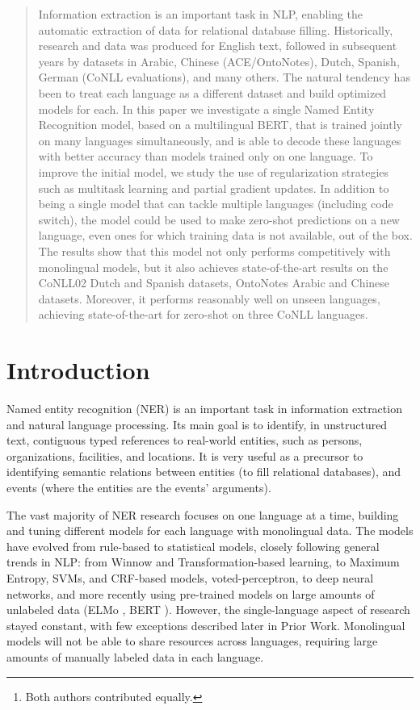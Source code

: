 \documentclass[letterpaper]{article} \usepackage{aaai20}  \usepackage{times}  \usepackage{helvet} \usepackage{courier}  \usepackage[hyphens]{url}  \usepackage{graphicx} \urlstyle{rm} \def\UrlFont{\rm}  \usepackage{graphicx}  \frenchspacing  \setlength{\pdfpagewidth}{8.5in}  \setlength{\pdfpageheight}{11in}  \usepackage{amsmath}
\author{
  Taesun Moon\thanks{Both authors contributed equally.} \and Parul Awasthy\footnotemark[1] \and Jian Ni \and Radu Florian \\
    IBM Research AI\\
    Yorktown Heights, NY 10598\\
    {\{tsmoon, awasthyp, nij, raduf\}@us.ibm.com}\\
}
\begin{document}
\maketitle

\begin{abstract}
Information extraction is an important task in NLP, enabling the
automatic extraction of data for relational database
filling. Historically, research and data was produced for English text,
followed in subsequent years by datasets in Arabic, Chinese
(ACE/OntoNotes), Dutch, Spanish, German (CoNLL evaluations), and many
others. The natural tendency has been to treat each language as a different
dataset and build optimized models for each. In this paper we
investigate a single Named Entity Recognition model, based on a
multilingual BERT, that is trained jointly on many languages
simultaneously, and is able to decode these languages with 
better accuracy than models trained only on one language. To improve the initial model, we study the use of regularization strategies such as multitask learning and partial gradient updates. In addition to being a single model that can tackle multiple languages (including code switch),
the model could be used to make zero-shot predictions on a new
language, even ones for which training data is not available, out of the box. The results show that this model not only performs competitively
with monolingual models, but it also achieves state-of-the-art
results on the CoNLL02 Dutch and Spanish datasets, OntoNotes Arabic
and Chinese datasets. Moreover, it performs reasonably well
on unseen languages, achieving state-of-the-art for
zero-shot on three CoNLL languages.
\end{abstract}

\section{Introduction} \label{sec:Introduction} 

Named entity recognition (NER) is an important
task in information extraction and natural language processing. Its
main goal is to identify, in unstructured text, contiguous typed references
to real-world entities, such as persons, organizations, facilities,
and locations. It is very useful as a precursor to identifying semantic
relations between entities (to fill relational databases), and events
(where the entities are the events' arguments). 


The vast majority of NER research focuses on one language at a time, building and tuning different models for each language with monolingual data. The models have evolved from rule-based to statistical models, closely following
general trends in NLP: from Winnow and Transformation-based learning, to
Maximum Entropy, SVMs, and CRF-based models, voted-perceptron, to
deep neural networks, and more recently using pre-trained models on large amounts of unlabeled data (ELMo \cite{ELMo18}, BERT \cite{BERT18}). However, the single-language aspect of research stayed constant, with few
exceptions described later in Prior Work. Monolingual models
will not be able to share resources across languages, requiring large 
amounts of manually labeled data in each language.
\end{document}
